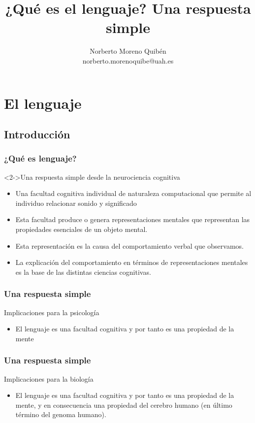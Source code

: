 \documentclass[compress]{beamer}
\title{¿Qué es el lenguaje? Una respuesta simple}
\author{Norberto Moreno Quibén\\
       norberto.morenoquibe@uah.es}
\date{}
\begin{document}
\section{El lenguaje}
\subsection{Introducción}

\begin{frame}
  \titlepage
\end{frame}



 	\begin{frame}

 \frametitle{¿Qué es lenguaje?}

\begin{alertblock}<2->{Una respuesta simple desde la neurociencia cognitiva}
  \begin{itemize}
	  \item<3->%
Una facultad cognitiva individual de naturaleza computacional que permite al individuo relacionar sonido y significado
\item<4->%
Esta facultad produce o \alert{genera} representaciones mentales que representan las propiedades esenciales de un objeto mental.
\item<5->%
Esta representación es la causa del comportamiento verbal que observamos.
\item<6->La explicación del comportamiento en términos de representaciones mentales es la base de las distintas ciencias cognitivas.
  \end{itemize}
\end{alertblock}

 \end{frame}


	\begin{frame}
	  \frametitle{Una respuesta simple}
	\begin{alertblock}{Implicaciones para la psicología}
	\begin{itemize}
	\item<2->%
	El lenguaje es una facultad cognitiva y por tanto es una \alert{propiedad de la mente}
	\end{itemize}
	
	\end{alertblock}
	\end{frame}


	\begin{frame}
	  \frametitle{Una respuesta simple}
	\begin{alertblock}{Implicaciones para la biología}
		\begin{itemize}
		\item<2->%
		El lenguaje es una facultad cognitiva y por tanto es una propiedad de la mente, y en consecuencia una \alert{propiedad del cerebro humano} (en último término del genoma humano).
		\end{itemize}
		
	\end{alertblock}
	\end{frame}
\end{document}
